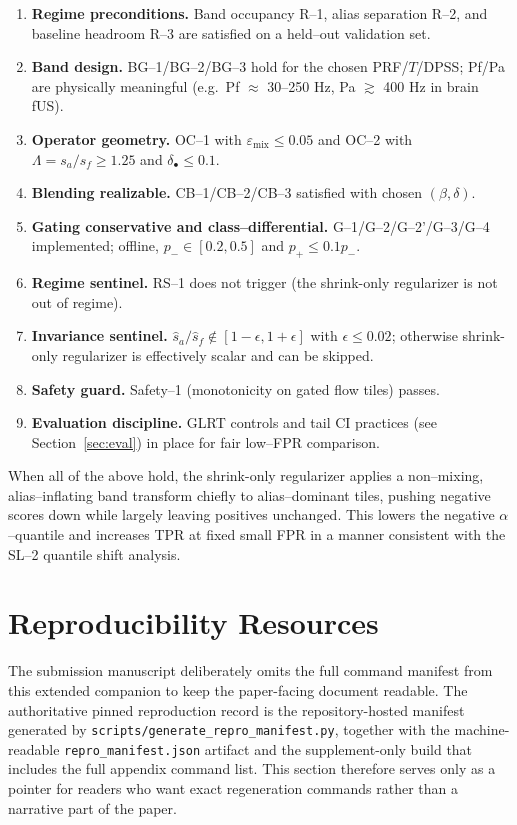 \documentclass[11pt]{article}
\DeclareRobustCommand{\path}[1]{\nolinkurl{#1}}
\newcommand{\wh}{\widehat}
\newif\ifSUPPLEMENTONLY
\begin{document}
\begin{enumerate}[label=\arabic*.,nosep]
  \item \textbf{Regime preconditions.} Band occupancy R--1, alias separation R--2, and baseline headroom R--3 are satisfied on a held--out validation set.
  \item \textbf{Band design.} BG--1/BG--2/BG--3 hold for the chosen PRF/$T$/DPSS; Pf/Pa are physically meaningful (e.g.\ Pf $\approx$ 30--250 Hz, Pa $\gtrsim$ 400 Hz in brain fUS).
  \item \textbf{Operator geometry.} OC--1 with $\varepsilon_{\text{mix}}\le 0.05$ and OC--2 with $\Lambda = s_a/s_f \ge 1.25$ and $\delta_\bullet\le 0.1$.
  \item \textbf{Blending realizable.} CB--1/CB--2/CB--3 satisfied with chosen $(\beta,\delta)$.
  \item \textbf{Gating conservative and class--differential.} G--1/G--2/G--2'/G--3/G--4 implemented; offline, $p_-\in[0.2,0.5]$ and $p_+\le 0.1p_-$.
  \item \textbf{Regime sentinel.} RS--1 does not trigger (the shrink-only regularizer is not out of regime).
  \item \textbf{Invariance sentinel.} $\wh s_a/\wh s_f \notin[1-\epsilon,1+\epsilon]$ with $\epsilon\le 0.02$; otherwise shrink-only regularizer is effectively scalar and can be skipped.
  \item \textbf{Safety guard.} Safety--1 (monotonicity on gated flow tiles) passes.
  \item \textbf{Evaluation discipline.} GLRT controls and tail CI practices (see \ifSUPPLEMENTONLY the main paper\else Section~\ref{sec:eval}\fi) in place for fair low--FPR comparison.
\end{enumerate}

When all of the above hold, the shrink-only regularizer applies a non--mixing, alias--inflating band transform chiefly to alias--dominant tiles, pushing negative scores down while largely leaving positives unchanged. This lowers the negative $\alpha$--quantile and increases TPR at fixed small FPR in a manner consistent with the SL--2 quantile shift analysis.



\ifSUPPLEMENTONLY

\else
\section{Reproducibility Resources}
\label{app:repro}
The submission manuscript deliberately omits the full command manifest from this extended companion to keep the paper-facing document readable. The authoritative pinned reproduction record is the repository-hosted manifest generated by \path{scripts/generate_repro_manifest.py}, together with the machine-readable \path{repro_manifest.json} artifact and the supplement-only build that includes the full appendix command list. This section therefore serves only as a pointer for readers who want exact regeneration commands rather than a narrative part of the paper.
\fi

\fi %
\end{document}

